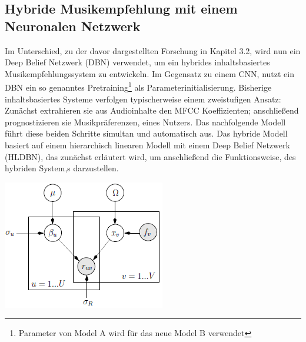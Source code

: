 \documentclass[twosided,a4,10pt]{article}
\begin{document}
\begin{multicols}{2}
		\subsection{Hybride Musikempfehlung mit einem Neuronalen Netzwerk}
		Im Unterschied, zu der davor dargestellten Forschung in Kapitel 3.2, wird nun ein Deep Belief Netzwerk (DBN) verwendet, um ein hybrides inhaltsbasiertes Musikempfehlungssystem zu entwickeln. Im Gegensatz zu einem CNN, nutzt ein DBN ein so genanntes Pretraining\footnote[15]{Parameter von Model A wird für das neue Model B verwendet} als Parameterinitialisierung. Bisherige inhaltsbasiertes Systeme verfolgen typischerweise einem zweistufigen Ansatz: Zunächst extrahieren sie aus Audioinhalte den MFCC Koeffizienten; anschließend prognostizieren sie Musikpräferenzen, eines Nutzers. Das nachfolgende Modell führt diese beiden Schritte simultan und automatisch aus. \cite{wang}\newline
		Das hybride Modell basiert auf einem hierarchisch linearen Modell mit einem Deep Belief Netzwerk (HLDBN), das zunächst erläutert wird, um anschließend die Funktionsweise, des hybriden System,s darzustellen.
		\begin{minipage}{0.45\textwidth}
			\centering
			\includegraphics{img/hlmdbn.png}
			\label{img:hlmdbn}
		\end{minipage}

\end{multicols}
\end{document}
